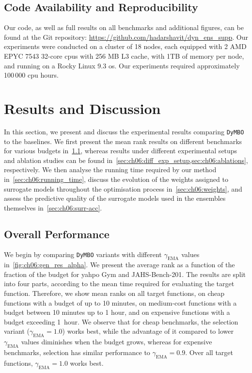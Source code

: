 \subsection{Code Availability and Reproducibility}
\label{sec:ch06:code-availability}
Our code, as well as full results on all benchmarks and additional figures, can be found at the Git repository: \url{https://github.com/hadarshavit/dyn_ens_supp}.
Our experiments were conducted on a cluster of 18 nodes,
each equipped with 2 AMD EPYC 7543 32-core \glspl{cpu} with 256 MB L3 cache, with 1TB of memory per node, and running on a Rocky Linux 9.3 \gls{os}.
Our experiments required approximately 100\,000 \gls{cpu} hours.

\section{Results and Discussion}
\label{sec:ch06:res}

In this section, we present and discuss the experimental results comparing \texttt{DyMBO} to the baselines.
We first present the mean rank results on different benchmarks for various budgets in~\cref{sec:ch06:res_general}, whereas results under different experimental setups and ablation studies can be found in~\cref{sec:ch06:diff_exp_setup,sec:ch06:ablations}, respectively. We then analyse the running time required by our method in~\cref{sec:ch06:running_time}, discuss the evolution of the weights assigned to surrogate models throughout the optimisation process in~\cref{sec:ch06:weights}, and assess the predictive quality of the surrogate models used in the ensembles themselves in~\cref{sec:ch06:surr-acc}.

\subsection{Overall Performance}
\label{sec:ch06:res_general}

We begin by comparing \texttt{DyMBO} variants with different $\gamma_{\mathrm{EMA}}$ values in~\cref{fig:ch06:gen_res_alpha}. We present the average rank as a function of the fraction of the budget for \gls{yahpo} Gym and JAHS-Bench-201. The results are split into four parts, according to the mean time required for evaluating the target function. Therefore, we show mean ranks on all target functions, on cheap functions with a budget of up to 10 minutes, on medium-cost functions with a budget
between 10 minutes up to 1 hour, and on expensive functions with a budget exceeding 1~hour.
We observe that for cheap benchmarks, the selection variant ($\gamma_{\mathrm{EMA}}=1.0$) works best, while the advantage of it compared to lower $\gamma_{\mathrm{EMA}}$ values diminishes when the budget grows, whereas for expensive benchmarks, selection has similar performance to $\gamma_{\mathrm{EMA}}=0.9$. Over all target functions, $\gamma_{\mathrm{EMA}}=1.0$ works best.

